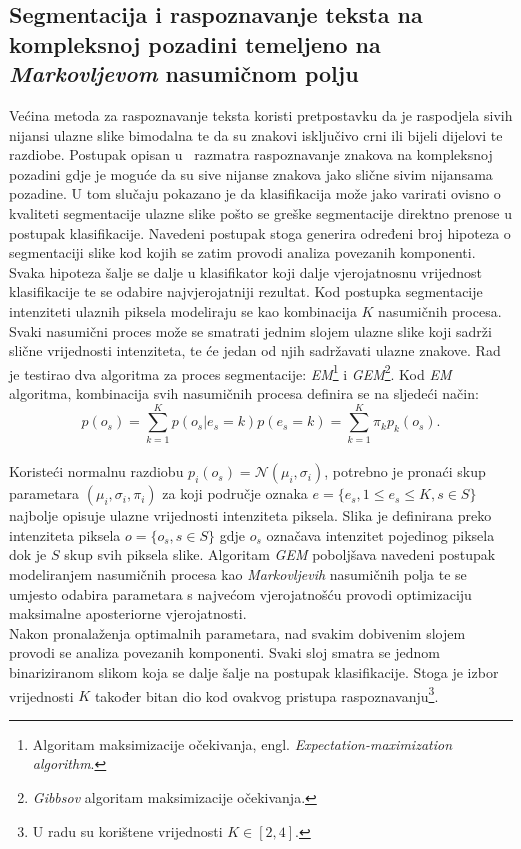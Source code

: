 \subsection{Segmentacija i raspoznavanje teksta na kompleksnoj pozadini temeljeno na \emph{Markovljevom} nasumičnom
polju}
\label{subsec:segmentacija-i-raspoznavanje-teksta-na-kompleksnoj-pozadini-temeljeno-na-markovljevom-nasumicnom-polju}
Većina metoda za raspoznavanje teksta koristi pretpostavku da je raspodjela sivih nijansi ulazne slike bimodalna te da
su znakovi isključivo crni ili bijeli dijelovi te razdiobe. Postupak opisan u\ \citep{chen2002} razmatra raspoznavanje
znakova na kompleksnoj pozadini gdje je moguće da su sive nijanse znakova jako slične sivim nijansama pozadine. U tom
slučaju pokazano je da klasifikacija može jako varirati ovisno o kvaliteti segmentacije ulazne slike pošto se greške
segmentacije direktno prenose u postupak klasifikacije. Navedeni postupak stoga generira određeni broj hipoteza o
segmentaciji slike kod kojih se zatim provodi analiza povezanih komponenti. Svaka hipoteza šalje se dalje u klasifikator
koji dalje vjerojatnosnu vrijednost klasifikacije te se odabire najvjerojatniji rezultat. Kod postupka segmentacije
intenziteti ulaznih piksela modeliraju se kao kombinacija $K$ nasumičnih procesa. Svaki nasumični proces može se
smatrati jednim slojem ulazne slike koji sadrži slične vrijednosti intenziteta, te će jedan od njih sadržavati ulazne
znakove. Rad je testirao dva algoritma za proces segmentacije: \emph{EM}\footnote{Algoritam maksimizacije očekivanja,
engl. \emph{Expectation-maximization algorithm}.} i \emph{GEM}\footnote{\emph{Gibbsov} algoritam maksimizacije
očekivanja.}. Kod \emph{EM} algoritma, kombinacija svih nasumičnih procesa definira se na sljedeći način:\\
\begin{equation*}
    p(o_s) = \sum_{k = 1}^{K} p(o_s | e_s = k) p(e_s = k) = \sum_{k = 1}^{K} \pi_k p_k(o_s).
\end{equation*}
\\
Koristeći normalnu razdiobu $p_i(o_s) = \mathcal{N}(\mu_i, \sigma_i)$, potrebno je pronaći skup parametara
$(\mu_i, \sigma_i, \pi_i)$ za koji područje oznaka $e = \{e_s, 1 \leq e_s \leq K, s \in S\}$ najbolje opisuje ulazne
vrijednosti intenziteta piksela. Slika je definirana preko intenziteta piksela $o = \{o_s, s \in S\}$ gdje $o_s$
označava intenzitet pojedinog piksela dok je $S$ skup svih piksela slike. Algoritam \emph{GEM} poboljšava navedeni
postupak modeliranjem nasumičnih procesa kao \emph{Markovljevih} nasumičnih polja te se umjesto odabira parametara s
najvećom vjerojatnošću provodi optimizaciju maksimalne aposteriorne vjerojatnosti.\\
Nakon pronalaženja optimalnih parametara, nad svakim dobivenim slojem provodi se analiza povezanih komponenti. Svaki
sloj smatra se jednom binariziranom slikom koja se dalje šalje na postupak klasifikacije. Stoga je izbor vrijednosti
$K$ također bitan dio kod ovakvog pristupa raspoznavanju\footnote{U radu su korištene vrijednosti $K \in [2, 4]$.}.
